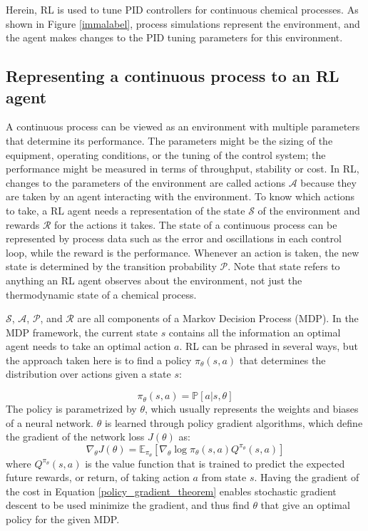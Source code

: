 Herein, RL is used to tune PID controllers for continuous chemical processes.  As shown in Figure \ref{immalabel}, process simulations represent the environment, and the agent makes changes to the PID tuning parameters for this environment. 

\subsection{Representing a continuous process to an RL agent}
A continuous process can be viewed as an environment with multiple parameters that determine its performance. The parameters might be the sizing of the equipment, operating conditions, or the tuning of the control system; the performance might be measured in terms of throughput, stability or cost. In RL, changes to the parameters of the environment are called actions $\mathcal A$ because they are taken by an agent interacting with the environment. To know which actions to take, a RL agent needs a representation of the state $\mathcal S$ of the environment and rewards $\mathcal R$ for the actions it takes. The state of a continuous process can be represented by process data such as the error and oscillations in each control loop,\cite{Lee2005, Badgwell2019, Shin2019} while the reward is the performance. Whenever an action is taken, the new state is determined by the transition probability $\mathcal P$. Note that state refers to anything an RL agent observes about the environment, not just the thermodynamic state of a chemical process.


$\mathcal S$, $\mathcal A$, $\mathcal P$, and $\mathcal R$ are all components of a Markov Decision Process (MDP). In the MDP framework, the current state $s$ contains all the information an optimal agent needs to take an optimal action $a$.  RL can be phrased in several ways, but the approach taken here is to find a policy $\pi_{\theta}(s,a)$ that determines the distribution over actions given a state $s$:

\begin{equation}
	\pi_{\theta}(s,a) = \mathbb P[a|s,\theta]
\end{equation}
The policy is parametrized by $\theta$, which usually represents the weights and biases of a neural network. $\theta$ is learned through policy gradient algorithms, which define the gradient of the network loss $J(\theta)$ as:
\begin{equation}
	\label{policy_gradient_theorem}
	\nabla_{\theta}J(\theta) = \mathbb E_{\pi_{\theta}} [\nabla_{\theta} \log \pi_\theta(s,a)Q^{\pi_{\theta}}(s,a)]
\end{equation}
where $Q^{\pi_{\theta}}(s,a)$ is the value function that is trained to predict the expected future rewards, or return, of taking action $a$ from state $s$. Having the gradient of the cost in Equation \ref{policy_gradient_theorem} enables stochastic gradient descent to be used minimize the gradient, and thus find $\theta$ that give an optimal policy for the given MDP.

